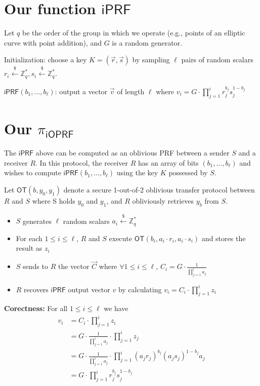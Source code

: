 \documentclass{article}
\newcommand{\getr}[0]{\stackrel{\$}{\leftarrow}}
\newcommand{\ioprf}[0]{\mathsf{i}\mathsf{OPRF}}
\newcommand{\iprf}[0]{\mathsf{i}\mathsf{PRF}}
\newcommand{\ot}[0]{\mathsf{OT}}
\newcommand{\proto}[0]{{\pi_{\ioprf}}}
\newcommand{\Z}[0]{\mathbb{Z}}
\begin{document}
\section{Our function $\iprf$}
Let $q$ be the order of the group in which we operate (e.g., points of
an elliptic curve with point addition), and $G$ is a random generator.

Initialization: choose a key $K=(\vec{{r}},\vec{s})$ by sampling $\ell$ pairs of random scalars ${r_{i}}\getr\Z^*_q,{s_{i}}\getr\Z^*_q.$

$\iprf(b_1,\ldots,b_\ell)$: output a vector $\vec{v}$ of length $\ell$ where $v_i = G \cdot \prod_{j=1}^{i} r_j^{b_j}s_j^{1-b_j}$

\section{Our $\proto$}

The $\iprf$ above can be computed as an oblivious PRF between a sender $S$ and a receiver $R$.  In this protocol,
the receiver $R$ has an array of bits $(b_1, \ldots, b_\ell)$ and wishes to compute $\iprf(b_1, \ldots, b_\ell)$ using
the key $K$ possessed by $S$.

Let $\ot(b, y_0, y_1)$ denote a secure 1-out-of-2 oblivious transfer protocol between $R$ and $S$ where
S holds $y_0$ and $y_1$, and $R$ obliviously retrieves $y_b$ from $S$.  

\begin{itemize}
\item $S$ generates $\ell$ random scalars $a_i\getr\Z^*_q$
\item For each $1 \leq i \leq \ell$, $R$ and $S$ execute $\ot(b_i, a_i\cdot{}r_i, a_i \cdot s_i)$ and stores the result as $z_i$
\item $S$ sends to $R$ the vector $\vec{C}$ where $\forall 1 \leq i \leq \ell$, $C_i =  G \cdot \frac{1}{\prod_{j=1}^{i} a_j}$
\item $R$ recovers $\iprf$ output vector $v$ by calculating $v_i = C_i \cdot \prod_{j=1}^{i} z_i$
\end{itemize}

{\bf Corectness:} For all $1 \leq i \leq \ell$ we have
\begin{equation}
\begin{aligned}
v_i &= C_i \cdot \prod_{j=1}^{i} z_i \\
&= G \cdot \frac{1}{\prod_{j=1}^{i} a_j} \cdot \prod_{j=1}^{i} z_j \\
&= G \cdot \frac{1}{\prod_{j=1}^{i} a_j} \cdot \prod_{j=1}^{i} (a_jr_j)^{b_j}(a_js_j)^{1-b_j} a_j \\
&= G \cdot \prod_{j=1}^{i} r_j^{b_j}s_j^{1-b_j}
\end{aligned}
\end{equation}
\end{document}
